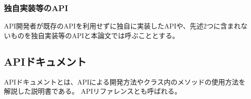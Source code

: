 \subsubsection {独自実装等のAPI}
API開発者が既存のAPIを利用せずに独自に実装したAPIや、先述2つに含まれないものを独自実装等のAPIと本論文では呼ぶこととする。


\subsection{APIドキュメント}
APIドキュメントとは、APIによる開発方法やクラス内のメソッドの使用方法を解説した説明書である。
APIリファレンスとも呼ばれる。




























